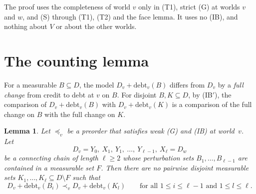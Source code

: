 \documentclass[11pt]{article}
\newtheorem{lemma}[theorem]{Lemma}
\theoremstyle{definition}\newtheorem{definition}[theorem]{Definition}
\theoremstyle{remark}\newtheorem{remark}[theorem]{Remark}
\newcommand{\debt}{\mathrm{debt}}
\begin{document}
The proof uses the completeness of world $v$ only in (T1), strict (G) at
worlds $v$ and $w$, and (S) through (T1), (T2) and the face lemma. It uses
no (IB), and nothing about $V$ or about the other worlds.

\section{The counting lemma}\label{sec:count}

For a measurable $B\subseteq D$, the model $D_v+\debt_v(B)$ differs from
$D_v$ by a \emph{full change} from credit to debt at $v$ on $B$. For
disjoint $B,K\subseteq D$, by (IB$'$), the comparison of
$D_v+\debt_v(B)$ with $D_v+\debt_v(K)$ is a comparison of the full change
on $B$ with the full change on $K$.

\begin{lemma}\label{lem:count}
Let $\preceq_v$ be a preorder that satisfies weak (G) and (IB) at
world~$v$. Let
\[
 D_v=Y_0,\ X_1,\ Y_1,\ \dots,\ Y_{\ell-1},\ X_\ell=D_w
\]
be a connecting chain of length $\ell\ge2$ whose perturbation sets
$B_1,\dots,B_{\ell-1}$ are contained in a measurable set $F$. Then there
are no pairwise disjoint measurable sets $K_1,\dots,K_\ell\subseteq
D\setminus F$ such that
\begin{equation}
 D_v+\debt_v(B_i)\prec_vD_v+\debt_v(K_l)\qquad
 \text{for all }1\le i\le\ell-1\text{ and }1\le l\le\ell.
 \label{eq:heavy}
\end{equation}
\end{lemma}
\end{document}
